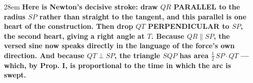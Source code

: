 \documentclass[border=4pt]{standalone}
\begin{document}
\begin{varwidth}{28em}
\large\bfseries
Here is Newton's decisive stroke: draw \textcolor{parblue}{$QR$ PARALLEL to the radius $SP$} rather than straight to      the tangent, and this parallel is one heart of the construction. Then drop \textcolor{perpred}{$QT$ PERPENDICULAR to      $SP$}, the second heart, giving a right angle at $T$. Because $QR\parallel SP$, the versed sine now speaks      directly in the language of the force's own direction. And because $QT\perp SP$, the triangle $SQP$ has      area $\tfrac{1}{2}\,SP\cdot QT$ — which, by Prop. I, is proportional to the time in which the arc is swept.
\end{varwidth}
\end{document}
